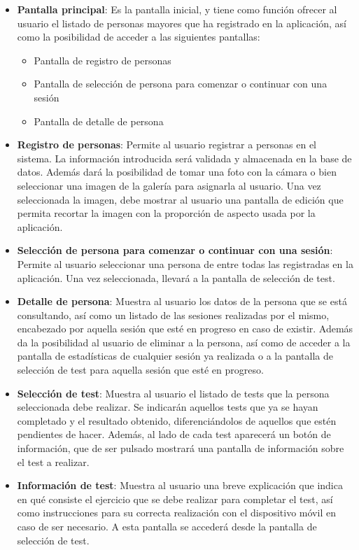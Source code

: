 \begin{itemize}
\item \textbf{Pantalla principal}: Es la pantalla inicial, y tiene como función ofrecer al usuario el listado de personas mayores que ha registrado en la aplicación, así como la posibilidad de acceder a las siguientes pantallas:
\begin{itemize}
\item Pantalla de registro de personas
\item Pantalla de selección de persona para comenzar o continuar con una sesión
\item Pantalla de detalle de persona
\end{itemize}
\item \textbf{Registro de personas}: Permite al usuario registrar a personas en el sistema. La información introducida será validada y almacenada en la base de datos. Además dará la posibilidad de tomar una foto con la cámara o bien seleccionar una imagen de la galería para asignarla al usuario. Una vez seleccionada la imagen, debe mostrar al usuario una pantalla de edición que permita recortar la imagen con la proporción de aspecto usada por la aplicación.
\item \textbf{Selección de persona para comenzar o continuar con una sesión}: Permite al usuario seleccionar una persona de entre todas las registradas en la aplicación. Una vez seleccionada, llevará a la pantalla de selección de test.
\item \textbf{Detalle de persona}: Muestra al usuario los datos de la persona que se está consultando, así como un listado de las sesiones realizadas por el mismo, encabezado por aquella sesión que esté en progreso en caso de existir. Además da la posibilidad al usuario de eliminar a la persona, así como de acceder a la pantalla de estadísticas de cualquier sesión ya realizada o a la pantalla de selección de test para aquella sesión que esté en progreso.
\item \textbf{Selección de test}: Muestra al usuario el listado de tests que la persona seleccionada debe realizar. Se indicarán aquellos tests que ya se hayan completado y el resultado obtenido, diferenciándolos de aquellos que estén pendientes de hacer. Además, al lado de cada test aparecerá un botón de información, que de ser pulsado mostrará una pantalla de información sobre el test a realizar.
\item \textbf{Información de test}: Muestra al usuario una breve explicación que indica en qué consiste el ejercicio que se debe realizar para completar el test, así como instrucciones para su correcta realización con el dispositivo móvil en caso de ser necesario. A esta pantalla se accederá desde la pantalla de selección de test.

\end{itemize}
